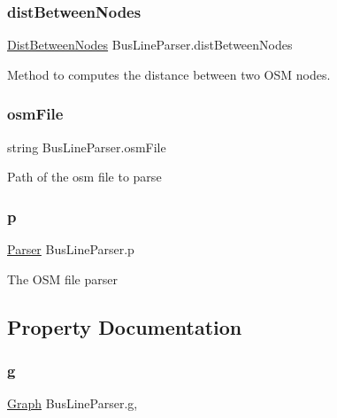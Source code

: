 \subsubsection{\texorpdfstring{dist\+Between\+Nodes}{distBetweenNodes}}
{\footnotesize\ttfamily \hyperlink{classDistBetweenNodes}{Dist\+Between\+Nodes} Bus\+Line\+Parser.\+dist\+Between\+Nodes\hspace{0.3cm}{\ttfamily [private]}}



Method to computes the distance between two O\+SM nodes.

\mbox{\label{classBusLineParser_a279ee65eb32a498b79e713bdf84a25d6}} 
\subsubsection{\texorpdfstring{osm\+File}{osmFile}}
{\footnotesize\ttfamily string Bus\+Line\+Parser.\+osm\+File\hspace{0.3cm}{\ttfamily [private]}}



Path of the osm file to parse

\mbox{\label{classBusLineParser_ae13dc355c5ddc5e97f3f597b40f22e61}} 
\subsubsection{\texorpdfstring{p}{p}}
{\footnotesize\ttfamily \hyperlink{classParser}{Parser} Bus\+Line\+Parser.\+p\hspace{0.3cm}{\ttfamily [private]}}



The O\+SM file parser



\subsection{Property Documentation}
\mbox{\label{classBusLineParser_abea0c70aead9b38f2162eb900826540f}} 
\subsubsection{\texorpdfstring{g}{g}}
{\footnotesize\ttfamily \hyperlink{classGraph}{Graph} Bus\+Line\+Parser.\+g\hspace{0.3cm}{\ttfamily [get]}, {}}



